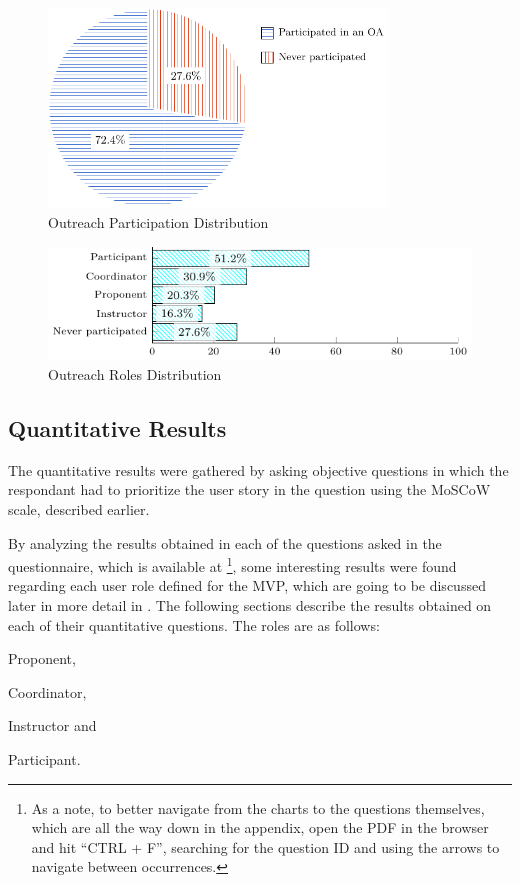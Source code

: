\begin{figure}[!htb]
  \caption{Outreach Participation Distribution}\label{fig:outreach-participation}
  \begin{center}
    \includegraphics[width=9cm]{img/5-outreach-participation.pdf}
  \end{center}
\end{figure}

\begin{figure}[!htb]
  \caption{Outreach Roles Distribution}\label{fig:outreach-roles}
  \begin{center}
    \includegraphics[width=13cm]{img/5-outreach-roles.pdf}
  \end{center}
\end{figure}

\subsection{Quantitative Results}\label{sec:survey-quant}

The quantitative results were gathered by asking objective questions in which the respondant had to prioritize the user story in the question using the MoSCoW scale, described earlier.

By analyzing the results obtained in each of the questions asked in the questionnaire, which is available at \footnote{As a note, to better navigate from the charts to the questions themselves, which are all the way down in the appendix, open the PDF in the browser and hit ``CTRL + F'', searching for the question \ac{ID} and using the arrows to navigate between occurrences.}, some interesting results were found regarding each user role defined for the \ac{MVP}, which are going to be discussed later in more detail in . The following sections describe the results obtained on each of their quantitative questions. The roles are as follows:
\begin{inparaenum}[(a)]
  \item Proponent,
  \item Coordinator,
  \item Instructor and
  \item Participant.
\end{inparaenum}

